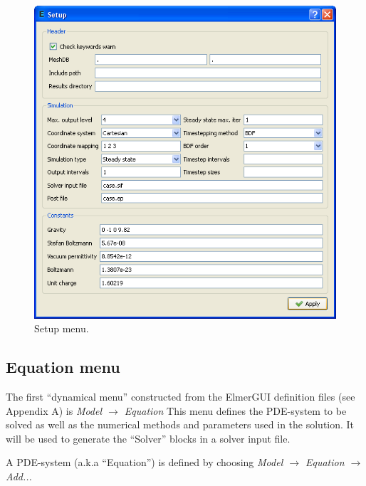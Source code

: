 \documentclass[a4paper,12pt]{article}
\newcommand{\menu}[2]{{\it \vskip2mm #1 $\rightarrow$ #2 \vskip2mm}}
\newcommand{\dynmenu}[3]{{\it \vskip2mm #1 $\rightarrow$ #2 $\rightarrow$ #3 \vskip2mm}}
\begin{document}
\begin{figure}[ht]
\begin{center}
 \includegraphics[scale=0.5]{images/setupmenu.png}
\caption{Setup menu.}
\end{center}
\end{figure}

\subsection{Equation menu}

The first ``dynamical menu'' constructed from the ElmerGUI definition files (see Appendix A) is
\menu{Model}{Equation}
\noindent This menu defines the PDE-system to be solved as well as the numerical
methods and parameters used in the solution. It will be used to generate the ``Solver''
blocks in a solver input file.

A PDE-system (a.k.a ``Equation'') is defined by choosing
\dynmenu{Model}{Equation}{Add...}
\end{document}

